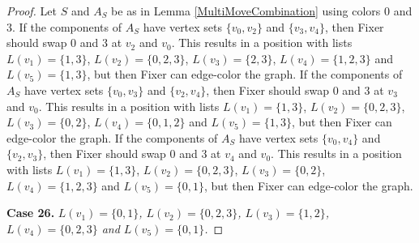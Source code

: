 \documentclass[12pt]{amsart}
\theoremstyle{plain}
\theoremstyle{definition}
\theoremstyle{remark}
\begin{document}
\begin{proof}
Let $S$ and $A_S$ be as in Lemma \ref{MultiMoveCombination} using colors $0$ and $3$. If the components of $A_S$ have vertex sets $\{v_0, v_2\}$ and $\{v_3, v_4\}$, then Fixer should swap 0 and 3 at $v_2$ and $v_0$. This results in a position with lists $L(v_1) = \{1, 3\}$, $L(v_2) = \{0, 2, 3\}$, $L(v_3) = \{2, 3\}$, $L(v_4) = \{1, 2, 3\}$ and $L(v_5) = \{1, 3\}$, but then Fixer can edge-color the graph.
If the components of $A_S$ have vertex sets $\{v_0, v_3\}$ and $\{v_2, v_4\}$, then Fixer should swap 0 and 3 at $v_3$ and $v_0$. This results in a position with lists $L(v_1) = \{1, 3\}$, $L(v_2) = \{0, 2, 3\}$, $L(v_3) = \{0, 2\}$, $L(v_4) = \{0, 1, 2\}$ and $L(v_5) = \{1, 3\}$, but then Fixer can edge-color the graph.
If the components of $A_S$ have vertex sets $\{v_0, v_4\}$ and $\{v_2, v_3\}$, then Fixer should swap 0 and 3 at $v_4$ and $v_0$. This results in a position with lists $L(v_1) = \{1, 3\}$, $L(v_2) = \{0, 2, 3\}$, $L(v_3) = \{0, 2\}$, $L(v_4) = \{1, 2, 3\}$ and $L(v_5) = \{0, 1\}$, but then Fixer can edge-color the graph.

\noindent\textbf{Case 26.  }\textit{$L(v_1) = \{0, 1\}$, $L(v_2) = \{0, 2, 3\}$, $L(v_3) = \{1, 2\}$, $L(v_4) = \{0, 2, 3\}$ and $L(v_5) = \{0, 1\}$.}


\end{proof}
\end{document}
